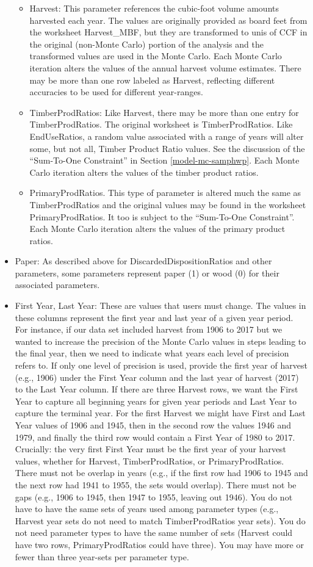 \documentclass[
  openany]{book}
\begin{document}
\begin{itemize}
\begin{itemize}
  \item
    Harvest: This parameter references the cubic-foot volume amounts harvested each year. The values are originally provided as board feet from the worksheet Harvest\_MBF, but they are transformed to unis of CCF in the original (non-Monte Carlo) portion of the analysis and the transformed values are used in the Monte Carlo. Each Monte Carlo iteration alters the values of the annual harvest volume estimates. There may be more than one row labeled as Harvest, reflecting different accuracies to be used for different year-ranges.
  \item
    TimberProdRatios: Like Harvest, there may be more than one entry for TimberProdRatios. The original worksheet is TimberProdRatios. Like EndUseRatios, a random value associated with a range of years will alter some, but not all, Timber Product Ratio values. See the discussion of the ``Sum-To-One Constraint'' in Section \ref{model-mc-samphwp}. Each Monte Carlo iteration alters the values of the timber product ratios.
  \item
    PrimaryProdRatios. This type of parameter is altered much the same as TimberProdRatios and the original values may be found in the worksheet PrimaryProdRatios. It too is subject to the ``Sum-To-One Constraint''. Each Monte Carlo iteration alters the values of the primary product ratios.
  \end{itemize}
\item
  Paper: As described above for DiscardedDispositionRatios and other parameters, some parameters represent paper (1) or wood (0) for their associated parameters.
\item
  First Year, Last Year: These are values that users must change. The values in these columns represent the first year and last year of a given year period. For instance, if our data set included harvest from 1906 to 2017 but we wanted to increase the precision of the Monte Carlo values in steps leading to the final year, then we need to indicate what years each level of precision refers to. If only one level of precision is used, provide the first year of harvest (e.g., 1906) under the First Year column and the last year of harvest (2017) to the Last Year column. If there are three Harvest rows, we want the First Year to capture all beginning years for given year periods and Last Year to capture the terminal year. For the first Harvest we might have First and Last Year values of 1906 and 1945, then in the second row the values 1946 and 1979, and finally the third row would contain a First Year of 1980 to 2017. Crucially: the very first First Year must be the first year of your harvest values, whether for Harvest, TimberProdRatios, or PrimaryProdRatios. There must not be overlap in years (e.g., if the first row had 1906 to 1945 and the next row had 1941 to 1955, the sets would overlap). There must not be gaps (e.g., 1906 to 1945, then 1947 to 1955, leaving out 1946). You do not have to have the same sets of years used among parameter types (e.g., Harvest year sets do not need to match TimberProdRatios year sets). You do not need parameter types to have the same number of sets (Harvest could have two rows, PrimaryProdRatios could have three). You may have more or fewer than three year-sets per parameter type.

\end{itemize}
\end{document}
